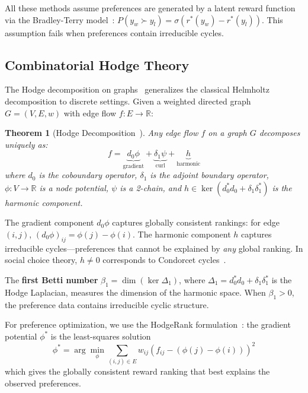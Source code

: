 \documentclass{article}
\newtheorem{theorem}{Theorem}
\begin{document}
All these methods assume preferences are generated by a latent reward function via the Bradley-Terry model~\citep{bradley1952rank}: $P(y_w \succ y_l) = \sigma(r^*(y_w) - r^*(y_l))$. This assumption fails when preferences contain irreducible cycles.

\subsection{Combinatorial Hodge Theory}
\label{sec:hodge_background}

The Hodge decomposition on graphs~\citep{jiang2011statistical} generalizes the classical Helmholtz decomposition to discrete settings. Given a weighted directed graph $G = (V, E, w)$ with edge flow $f: E \to \mathbb{R}$:

\begin{theorem}[Hodge Decomposition~\citep{jiang2011statistical}]
\label{thm:hodge}
Any edge flow $f$ on a graph $G$ decomposes uniquely as:
\begin{equation}
    f = \underbrace{d_0 \phi}_{\text{gradient}} + \underbrace{\delta_1 \psi}_{\text{curl}} + \underbrace{h}_{\text{harmonic}}
\end{equation}
where $d_0$ is the coboundary operator, $\delta_1$ is the adjoint boundary operator, $\phi: V \to \mathbb{R}$ is a node potential, $\psi$ is a 2-chain, and $h \in \ker(d_0^* d_0 + \delta_1 \delta_1^*)$ is the harmonic component.
\end{theorem}

The gradient component $d_0 \phi$ captures globally consistent rankings: for edge $(i, j)$, $(d_0 \phi)_{ij} = \phi(j) - \phi(i)$. The harmonic component $h$ captures irreducible cycles---preferences that cannot be explained by \emph{any} global ranking. In social choice theory, $h \neq 0$ corresponds to Condorcet cycles~\citep{condorcet1785essai}.

The \textbf{first Betti number} $\beta_1 = \dim(\ker \Delta_1)$, where $\Delta_1 = d_0^* d_0 + \delta_1 \delta_1^*$ is the Hodge Laplacian, measures the dimension of the harmonic space. When $\beta_1 > 0$, the preference data contains irreducible cyclic structure.

For preference optimization, we use the HodgeRank formulation~\citep{jiang2011statistical}: the gradient potential $\phi^*$ is the least-squares solution
\begin{equation}
    \phi^* = \arg\min_\phi \sum_{(i,j) \in E} w_{ij} \left(f_{ij} - (\phi(j) - \phi(i))\right)^2
\end{equation}
which gives the globally consistent reward ranking that best explains the observed preferences.
\end{document}
